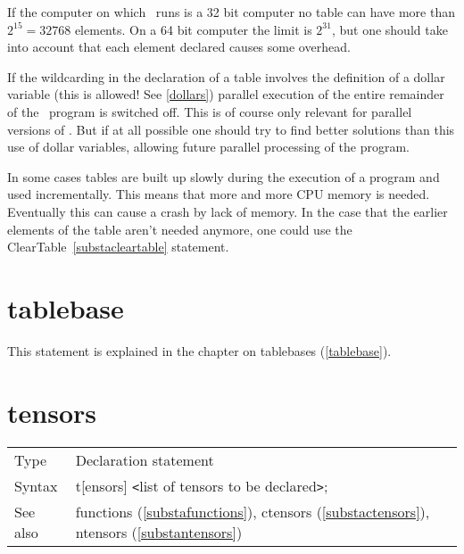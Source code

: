 \noindent If the computer on which \FORM\ runs is a 32 bit 
computer no table can have more than $2^{15} = 32768$ elements. On a 
64 bit computer the limit is $2^{31}$, but one should take 
into account that each element declared causes some overhead. \vspace{4mm}

\noindent If the wildcarding in the declaration of a table involves the 
definition of a dollar variable (this is allowed! See 
\ref{dollars}) parallel execution of the entire remainder of the \FORM\ 
program is switched off. This is of course only relevant for parallel 
versions of \FORM. But if at all possible one should try to find better 
solutions than this use of dollar variables, allowing future parallel 
processing of the program.

\noindent In some cases tables are built up slowly during the execution of 
a program and used incrementally. This means that more and more CPU memory 
is needed. Eventually this can cause a crash by lack of memory. In the case 
that the earlier elements of the table aren't needed anymore, one could use 
the ClearTable~\ref{substacleartable} statement.
\vspace{10mm}


\section{tablebase}
\label{substatablebase}

\noindent This statement is explained in the chapter on 
tablebases (\ref{tablebase}).
\vspace{10mm}

 
\section{tensors}
\label{substatensors}

\noindent \begin{tabular}{ll}
Type & Declaration statement\\
Syntax & t[ensors] {\tt<}list of tensors to be declared{\tt>}; \\
See also & functions (\ref{substafunctions}), ctensors 
        (\ref{substactensors}), ntensors (\ref{substantensors})
\end{tabular}\vspace{4mm}

